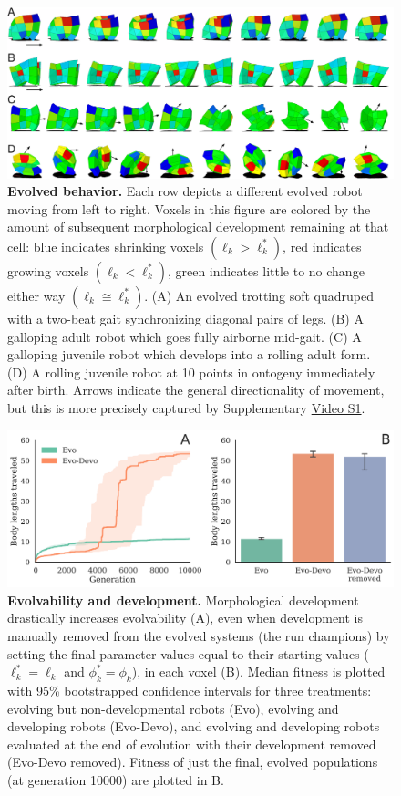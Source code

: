 



\begin{figure}[t]
\includegraphics[width=\linewidth]{Chapter04/Fig2}
\caption{\label{fig:trot-gallop-roll}\textbf{Evolved behavior.}
Each row depicts a different evolved robot moving from left to right. 
Voxels in this figure are colored by the amount of subsequent morphological development remaining at that cell: blue indicates shrinking voxels $(\ell_k > \ell_k^*)$, red indicates growing voxels $(\ell_k < \ell_k^*)$, green indicates little to no change either way $(\ell_k \cong \ell_k^*)$.
(A) An evolved trotting soft quadruped with a two-beat gait synchronizing diagonal pairs of legs. 
(B) A galloping adult robot which goes fully airborne mid-gait.
(C) A galloping juvenile robot which develops into a rolling adult form. 
(D) A rolling juvenile robot at 10 points in ontogeny immediately after birth.
Arrows indicate the general directionality of movement,  
but this is more precisely captured by
Supplementary \href{https://youtu.be/Ee2sU-AZWC4}{\color{blue}Video S1}. 
}
\end{figure}


\begin{figure}[t]
\centering
\includegraphics[width=0.9\linewidth]{Chapter04/Fig3}
\caption{\label{fig-fitness}\textbf{Evolvability and development.} Morphological development drastically increases evolvability (A), even when development is manually removed from the evolved systems (the run champions) by setting the final parameter values equal to their starting values ($\ell_k^*=\ell_k$ and $\phi_k^*=\phi_k$), in each voxel (B).
Median fitness is plotted with 95\% bootstrapped confidence intervals for three treatments: evolving but non-developmental robots (Evo), evolving and developing robots (Evo-Devo), and evolving and developing robots evaluated at the end of evolution with their development removed (Evo-Devo removed).
Fitness of just the final, evolved populations (at generation 10000) are plotted in B.}
\end{figure}



